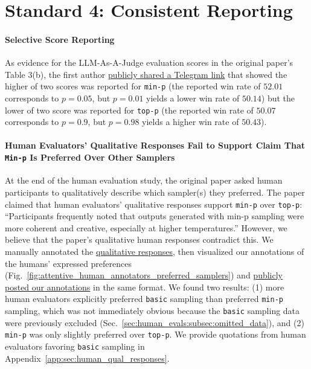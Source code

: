 \section{Standard 4: Consistent Reporting}

\paragraph{Selective Score Reporting}

As evidence for the LLM-As-A-Judge evaluation scores in the original paper's Table 3(b), the first author \href{https://t.me/senior_augur/76}{publicly shared a Telegram link} that showed the higher of two scores was reported for \texttt{min-p} (the reported win rate of $52.01$ corresponds to $p=0.05$, but $p=0.01$ yields a lower win rate of $50.14$) but the lower of two score was reported for \texttt{top-p} (the reported win rate of $50.07$ corresponds to $p=0.9$, but $p=0.98$ yields a higher win rate of $50.43$).

\paragraph{Human Evaluators' Qualitative Responses Fail to Support Claim That \texttt{Min-p} Is Preferred Over Other Samplers}
\label{sec:human_evals:subsec:human_feedback}


At the end of the human evaluation study, the original paper asked human participants to qualitatively describe which sampler(s) they preferred. The paper claimed that human evaluators' qualitative responses support \texttt{min-p} over \texttt{top-p}: ``Participants frequently noted that outputs generated with min-p sampling were more coherent and creative, especially at higher temperatures.''
%
% 
However, we believe that the paper's qualitative human responses contradict this.
We manually annotated the \href{https://github.com/menhguin/minp_paper/blob/main/min_p%20user%20preference%20study%20v2.0%20(Responses)%20-%20Form%20responses%201%20(1)%20(2).csv}{qualitative responses}, then visualized our annotations of the humans' expressed preferences (Fig.~\ref{fig:attentive_human_annotators_preferred_samplers}) and \href{https://docs.google.com/spreadsheets/d/1-KNh4-dbrXBafb9iUQINqFBjDrZvkScPNbGH6IENecQ/edit?gid=1288914057#gid=1288914057}{publicly posted our annotations} in the same format.
We found two results: (1) more human evaluators explicitly preferred \texttt{basic} sampling than preferred \texttt{min-p} sampling, which was not immediately obvious because the \texttt{basic} sampling data were previously excluded (Sec.~\ref{sec:human_evals:subsec:omitted_data}), and (2) \texttt{min-p} was only slightly preferred over \texttt{top-p}.
We provide quotations from human evaluators favoring \texttt{basic} sampling in Appendix~\ref{app:sec:human_qual_responses}.



